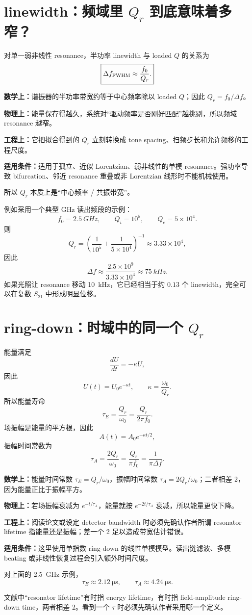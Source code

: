 \documentclass[11pt,a4paper,openany]{ctexrep}
\newcommand{\formulaexplain}[4]{%
\begin{formulaguidebox}
\textbf{\color{KidBlue}数学上：}#1\par
\textbf{\color{KidTeal}物理上：}#2\par
\textbf{\color{KidGold!55!black}工程上：}#3\par
\textbf{\color{KidRed}适用条件：}#4
\end{formulaguidebox}%
}
\begin{document}
\section{linewidth：频域里 $Q_r$ 到底意味着多窄？}

对单一弱非线性 resonance，半功率 linewidth 与 loaded $Q$ 的关系为
\[
\boxed{
\Delta f_{\rm FWHM}\approx\frac{f_0}{Q_r}.
}
\]
\formulaexplain
{谐振器的半功率带宽约等于中心频率除以 loaded $Q$；因此 $Q_r=f_0/\Delta f$。}
{能量保存得越久，系统对“驱动频率是否刚好匹配”越挑剔，所以频域 resonance 越窄。}
{它把拟合得到的 $Q_r$ 立刻转换成 tone spacing、扫频步长和允许频移的工程尺度。}
{适用于孤立、近似 Lorentzian、弱非线性的单模 resonance。强功率导致 bifurcation、邻近 resonance 重叠或非 Lorentzian 线形时不能机械使用。}
所以 $Q_r$ 本质上是“中心频率 / 共振带宽”。

例如采用一个典型 GHz 读出频段的示例：
\[
f_0=\SI{2.5}{GHz},\qquad Q_i=10^5,\qquad Q_c=5\times10^4.
\]
则
\[
Q_r=\left(\frac1{10^5}+\frac1{5\times10^4}\right)^{-1}
\approx3.33\times10^4,
\]
因此
\[
\boxed{
\Delta f\approx\frac{2.5\times10^9}{3.33\times10^4}
\approx\SI{75}{kHz}.
}
\]
如果光照让 resonance 移动 \SI{10}{kHz}，它已经相当于约 $0.13$ 个 linewidth，完全可以在复数 $S_{21}$ 中形成明显位移。

\section{ring-down：时域中的同一个 $Q_r$}

能量满足
\[
\frac{dU}{dt}=-\kappa U,
\]
因此
\[
U(t)=U_0e^{-\kappa t},
\qquad
\kappa=\frac{\omega_0}{Q_r}.
\]
所以能量寿命
\[
\boxed{
\tau_E=\frac{Q_r}{\omega_0}=\frac{Q_r}{2\pi f_0}.
}
\]
场振幅是能量的平方根，因此
\[
A(t)=A_0e^{-\kappa t/2},
\]
振幅时间常数为
\[
\boxed{
\tau_A=\frac{2Q_r}{\omega_0}=\frac{Q_r}{\pi f_0}
=\frac{1}{\pi\Delta f}.
}
\]
\formulaexplain
{能量时间常数 $\tau_E=Q_r/\omega_0$，振幅时间常数 $\tau_A=2Q_r/\omega_0$；二者相差 2，因为能量正比于振幅平方。}
{若场振幅衰减为 $e^{-t/\tau_A}$，能量就按 $e^{-2t/\tau_A}$ 衰减，所以能量更快下降。}
{阅读论文或设定 detector bandwidth 时必须先确认作者所谓 resonator lifetime 指能量还是振幅；差一个 2 足以造成带宽估计错误。}
{这里使用单指数 ring-down 的线性单模模型。读出链滤波、多模 beating 或非线性恢复过程会引入额外时间尺度。}

对上面的 \SI{2.5}{GHz} 示例，
\[
\tau_E\approx\SI{2.12}{\micro\second},
\qquad
\tau_A\approx\SI{4.24}{\micro\second}.
\]

\begin{mistakebox}
文献中“resonator lifetime”有时指 energy lifetime，有时指 field-amplitude ring-down time，两者相差 2。看到一个 $\tau$ 时必须先确认作者采用哪一个定义。
\end{mistakebox}
\end{document}
